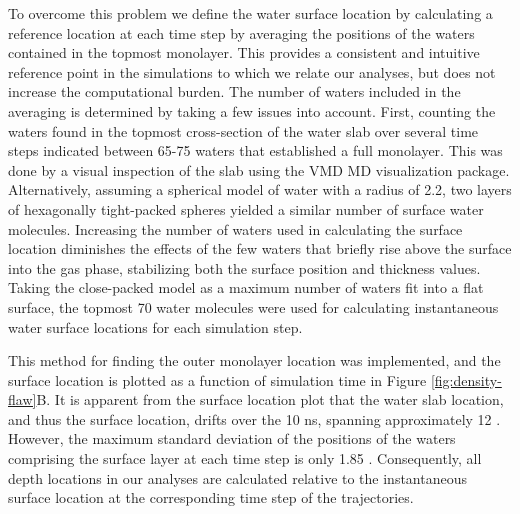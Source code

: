 	To overcome this problem we define the water surface location by calculating a reference location at each time step by averaging the positions of the waters contained in the topmost monolayer. This provides a consistent and intuitive reference point in the simulations to which we relate our analyses, but does not increase the computational burden. The number of waters included in the averaging is determined by taking a few issues into account. First, counting the waters found in the topmost cross-section of the water slab over several time steps indicated between 65-75 waters that established a full monolayer. This was done by a visual inspection of the slab using the VMD MD visualization package.\cite{Humphrey1996} Alternatively, assuming a spherical model of water with a radius of 2.2\angs, two layers of hexagonally tight-packed spheres yielded a similar number of surface water molecules. Increasing the number of waters used in calculating the surface location diminishes the effects of the few waters that briefly rise above the surface into the gas phase, stabilizing both the surface position and thickness values. Taking the close-packed model as a maximum number of waters fit into a flat surface, the topmost 70 water molecules were used for calculating instantaneous water surface locations for each simulation step. 
  
This method for finding the outer monolayer location was implemented, and the surface location is plotted as a function of simulation time in Figure \ref{fig:density-flaw}B. It is apparent from the surface location plot that the water slab location, and thus the surface location, drifts over the 10 ns, spanning approximately 12 \angs. However, the maximum standard deviation of the positions of the waters comprising the surface layer at each time step is only 1.85 \angs. Consequently, all depth locations in our analyses are calculated relative to the instantaneous surface location at the corresponding time step of the trajectories.


